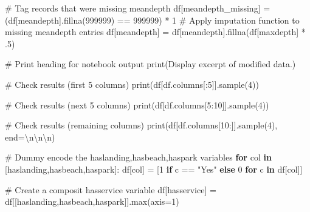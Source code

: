 \documentclass[
]{article}
\newenvironment{Shaded}{\begin{snugshade}}{\end{snugshade}}
\newcommand{\BuiltInTok}[1]{\textcolor[rgb]{0.00,0.23,0.31}{#1}}
\newcommand{\CharTok}[1]{\textcolor[rgb]{0.13,0.47,0.30}{#1}}
\newcommand{\CommentTok}[1]{\textcolor[rgb]{0.37,0.37,0.37}{#1}}
\newcommand{\ControlFlowTok}[1]{\textcolor[rgb]{0.00,0.23,0.31}{\textbf{#1}}}
\newcommand{\DecValTok}[1]{\textcolor[rgb]{0.68,0.00,0.00}{#1}}
\newcommand{\FloatTok}[1]{\textcolor[rgb]{0.68,0.00,0.00}{#1}}
\newcommand{\KeywordTok}[1]{\textcolor[rgb]{0.00,0.23,0.31}{\textbf{#1}}}
\newcommand{\NormalTok}[1]{\textcolor[rgb]{0.00,0.23,0.31}{#1}}
\newcommand{\OperatorTok}[1]{\textcolor[rgb]{0.37,0.37,0.37}{#1}}
\newcommand{\StringTok}[1]{\textcolor[rgb]{0.13,0.47,0.30}{#1}}
\begin{document}
\begin{Shaded}
\begin{Highlighting}[]
\CommentTok{\# Tag records that were missing meandepth}
\NormalTok{df[}\StringTok{\textquotesingle{}meandepth\_missing\textquotesingle{}}\NormalTok{] }\OperatorTok{=}\NormalTok{ (df[}\StringTok{\textquotesingle{}meandepth\textquotesingle{}}\NormalTok{].fillna(}\DecValTok{999999}\NormalTok{) }\OperatorTok{==} \DecValTok{999999}\NormalTok{) }\OperatorTok{*} \DecValTok{1}
\CommentTok{\# Apply imputation function to missing meandepth entries}
\NormalTok{df[}\StringTok{\textquotesingle{}meandepth\textquotesingle{}}\NormalTok{] }\OperatorTok{=}\NormalTok{ df[}\StringTok{\textquotesingle{}meandepth\textquotesingle{}}\NormalTok{].fillna(df[}\StringTok{\textquotesingle{}maxdepth\textquotesingle{}}\NormalTok{] }\OperatorTok{*} \FloatTok{.5}\NormalTok{)}

\CommentTok{\# Print heading for notebook output}
\BuiltInTok{print}\NormalTok{(}\StringTok{\textquotesingle{}Display excerpt of modified data.\textquotesingle{}}\NormalTok{)}

\CommentTok{\# Check results (first 5 columns)}
\BuiltInTok{print}\NormalTok{(df[df.columns[:}\DecValTok{5}\NormalTok{]].sample(}\DecValTok{4}\NormalTok{))}

\CommentTok{\# Check results (next 5 columns)}
\BuiltInTok{print}\NormalTok{(df[df.columns[}\DecValTok{5}\NormalTok{:}\DecValTok{10}\NormalTok{]].sample(}\DecValTok{4}\NormalTok{))}

\CommentTok{\# Check results (remaining columns)}
\BuiltInTok{print}\NormalTok{(df[df.columns[}\DecValTok{10}\NormalTok{:]].sample(}\DecValTok{4}\NormalTok{), end}\OperatorTok{=}\StringTok{\textquotesingle{}}\CharTok{\textbackslash{}n\textbackslash{}n\textbackslash{}n}\StringTok{\textquotesingle{}}\NormalTok{)}

\CommentTok{\# Dummy encode the \textquotesingle{}haslanding\textquotesingle{},\textquotesingle{}hasbeach\textquotesingle{},\textquotesingle{}haspark\textquotesingle{} variables}
\ControlFlowTok{for}\NormalTok{ col }\KeywordTok{in}\NormalTok{ [}\StringTok{\textquotesingle{}haslanding\textquotesingle{}}\NormalTok{,}\StringTok{\textquotesingle{}hasbeach\textquotesingle{}}\NormalTok{,}\StringTok{\textquotesingle{}haspark\textquotesingle{}}\NormalTok{]:}
\NormalTok{    df[col] }\OperatorTok{=}\NormalTok{ [}\DecValTok{1} \ControlFlowTok{if}\NormalTok{ c }\OperatorTok{==} \StringTok{"Yes"} \ControlFlowTok{else} \DecValTok{0} \ControlFlowTok{for}\NormalTok{ c }\KeywordTok{in}\NormalTok{ df[col]]}

\CommentTok{\# Create a composit hasservice variable}
\NormalTok{df[}\StringTok{\textquotesingle{}hasservice\textquotesingle{}}\NormalTok{] }\OperatorTok{=}\NormalTok{ df[[}\StringTok{\textquotesingle{}haslanding\textquotesingle{}}\NormalTok{,}\StringTok{\textquotesingle{}hasbeach\textquotesingle{}}\NormalTok{,}\StringTok{\textquotesingle{}haspark\textquotesingle{}}\NormalTok{]].}\BuiltInTok{max}\NormalTok{(axis}\OperatorTok{=}\DecValTok{1}\NormalTok{)}


\end{Highlighting}
\end{Shaded}
\end{document}
